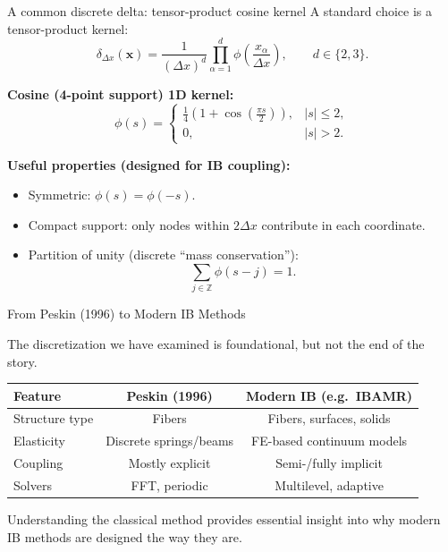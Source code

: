 \documentclass{beamer}
\begin{document}
\begin{frame}{A common discrete delta: tensor-product cosine kernel}
\small
A standard choice is a tensor-product kernel:
\[
\delta_{\Delta x}(\mathbf{x})
=
\frac{1}{(\Delta x)^{d}}
\prod_{\alpha=1}^{d}\phi\!\left(\frac{x_{\alpha}}{\Delta x}\right),
\qquad d\in\{2,3\}.
\]

\medskip
\textbf{Cosine (4-point support) 1D kernel:}
\[
\phi(s)=
\begin{cases}
\frac{1}{4}\left(1+\cos\!\left(\frac{\pi s}{2}\right)\right), & |s|\le 2,\\[6pt]
0, & |s|>2.
\end{cases}
\]

\medskip
\textbf{Useful properties (designed for IB coupling):}
\begin{itemize}
\item Symmetric: $\phi(s)=\phi(-s)$.
\item Compact support: only nodes within $2\Delta x$ contribute in each coordinate.
\item Partition of unity (discrete “mass conservation”):
\[
\sum_{j\in\mathbb{Z}}\phi(s-j)=1.
\]
\end{itemize}
\end{frame}

\begin{frame}{From Peskin (1996) to Modern IB Methods}
\small

The discretization we have examined is foundational, but not the end
of the story.

\medskip
\begin{center}
\begin{tabular}{l|c|c}
\textbf{Feature} & \textbf{Peskin (1996)} & \textbf{Modern IB (e.g.\ IBAMR)} \\
\hline
Structure type & Fibers & Fibers, surfaces, solids \\
Elasticity & Discrete springs/beams & FE-based continuum models \\
Coupling & Mostly explicit & Semi-/fully implicit \\
Solvers & FFT, periodic & Multilevel, adaptive \\
\end{tabular}
\end{center}

\medskip
Understanding the classical method provides essential insight into
why modern IB methods are designed the way they are.

\end{frame}
\end{document}
